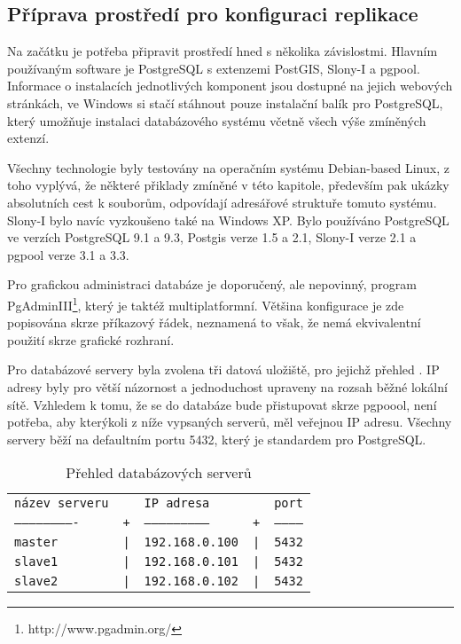 \subsection{Příprava prostředí pro konfiguraci replikace}
\label{kPriprava}

Na začátku je potřeba připravit prostředí hned s několika závislostmi. Hlavním používaným software je PostgreSQL s extenzemi PostGIS, Slony-I a pgpool. Informace o instalacích jednotlivých komponent jsou dostupné na jejich webových stránkách, ve Windows si stačí stáhnout pouze instalační balík pro PostgreSQL, který umožňuje instalaci databázového systému včetně všech výše zmíněných extenzí. 

Všechny technologie byly testovány na operačním systému Debian-based Linux, z toho vyplývá, že některé přiklady zmíněné v této kapitole, především pak ukázky absolutních cest k souborům, odpovídají adresářové struktuře tomuto systému. Slony-I bylo navíc vyzkoušeno také na Windows XP. Bylo používáno PostgreSQL ve verzích PostgreSQL 9.1 a 9.3, Postgis verze 1.5 a 2.1, Slony-I verze 2.1 a pgpool verze 3.1 a 3.3.

Pro grafickou administraci databáze je doporučený, ale nepovinný, program PgAdminIII\footnote{http://www.pgadmin.org/}, který je taktéž multiplatformní. Většina konfigurace je zde popisována skrze příkazový řádek, neznamená to však, že nemá ekvivalentní použití skrze grafické rozhraní.

Pro databázové servery byla zvolena tři datová uložiště, pro jejichž přehled . IP adresy byly pro větší názornost a jednoduchost upraveny na rozsah běžné lokální sítě. Vzhledem k tomu, že se do databáze bude přistupovat skrze pgpoool, není potřeba, aby kterýkoli z níže vypsaných serverů, měl veřejnou IP adresu. Všechny servery běží na defaultním portu 5432, který je standardem pro PostgreSQL.

      \begin{table}[H]
        \label{tServery}
        \caption{Přehled databázových serverů}
        \begin{center}
            \begin{tabular}{lllll}
              \texttt{název serveru} & & \texttt{IP adresa} & & \texttt{port}\\
              \texttt{-------------------------} & \texttt{+} & \texttt{--------------------------} & \texttt{+} & \texttt{------------}\\
                                 \texttt{master} & \texttt{|} & \texttt{192.168.0.100} & \texttt{|} & \texttt{5432}\\
                                 \texttt{slave1} & \texttt{|} & \texttt{192.168.0.101} & \texttt{|} & \texttt{5432}\\
                                 \texttt{slave2} & \texttt{|} & \texttt{192.168.0.102} & \texttt{|} & \texttt{5432}\\
            \end{tabular}
        \end{center}
      \end{table}

